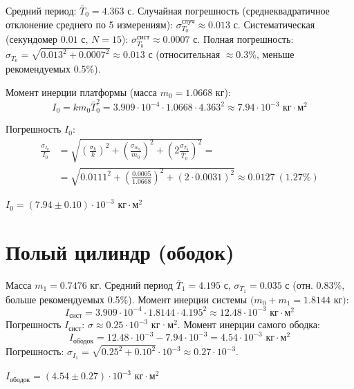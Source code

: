 \documentclass[12pt,a4paper]{article}
\begin{document}
Средний период: \(\bar{T}_0 = 4.363\) с.
Случайная погрешность (среднеквадратичное отклонение среднего по 5 измерениям): \(\sigma_{T_0}^{\text{случ}} \approx 0.013\) с.
Систематическая (секундомер \(0.01\) с, \(N=15\)): \(\sigma_{T_0}^{\text{сист}} \approx 0.0007\) с.
Полная погрешность: \(\sigma_{T_0} = \sqrt{0.013^2 + 0.0007^2} \approx 0.013\) с (относительная \(\approx 0.3\%\), меньше рекомендуемых 0.5\%).

Момент инерции платформы (масса \(m_0 = 1.0668\) кг):
\begin{equation}
    I_0 = k m_0 \bar{T}_0^2 = 3.909 \cdot 10^{-4} \cdot 1.0668 \cdot 4.363^2 \approx 7.94 \cdot 10^{-3} \text{ кг}\cdot\text{м}^2
\end{equation}

Погрешность \(I_0\):
\begin{equation}
\begin{split}
    \frac{\sigma_{I_0}}{I_0} &= \sqrt{\left(\frac{\sigma_k}{k}\right)^2 + \left(\frac{\sigma_{m_0}}{m_0}\right)^2 + \left(2\frac{\sigma_{T_0}}{\bar{T}_0}\right)^2} = \\
    &= \sqrt{0.0111^2 + \left(\frac{0.0005}{1.0668}\right)^2 + (2 \cdot 0.0031)^2} \approx 0.0127 \ (1.27\%)
\end{split}
\end{equation}
\begin{center}
\(I_0 = (7.94 \pm 0.10) \cdot 10^{-3} \text{ кг}\cdot\text{м}^2\)
\end{center}

\section{Полый цилиндр (ободок)}
Масса \(m_1 = 0.7476\) кг. Средний период \(\bar{T}_1 = 4.195\) с, \(\sigma_{T_1} = 0.035\) с (отн. 0.83\%, больше рекомендуемых 0.5\%).
Момент инерции системы \((m_0 + m_1 = 1.8144\) кг\()\):
\begin{equation}
    I_{\text{сист}} = 3.909 \cdot 10^{-4} \cdot 1.8144 \cdot 4.195^2 \approx 12.48 \cdot 10^{-3} \text{ кг}\cdot\text{м}^2
\end{equation}
Погрешность \(I_{\text{сист}}\): \(\sigma \approx 0.25 \cdot 10^{-3}\) кг·м\(^2\).
Момент инерции самого ободка:
\begin{equation}
    I_{\text{ободок}} = 12.48 \cdot 10^{-3} - 7.94 \cdot 10^{-3} = 4.54 \cdot 10^{-3} \text{ кг}\cdot\text{м}^2
\end{equation}
Погрешность: \(\sigma_{I_1} = \sqrt{0.25^2 + 0.10^2} \cdot 10^{-3} \approx 0.27 \cdot 10^{-3}\).
\begin{center}
\(I_{\text{ободок}} = (4.54 \pm 0.27) \cdot 10^{-3} \text{ кг}\cdot\text{м}^2\)
\end{center}
\end{document}
